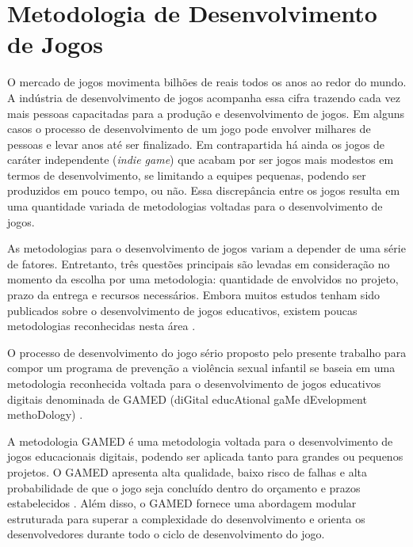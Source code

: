 \section{Metodologia de Desenvolvimento de Jogos}\label{sec:Engenharia}





O mercado de jogos movimenta bilhões de reais todos os anos ao redor do mundo. A indústria de desenvolvimento de jogos acompanha essa cifra trazendo cada vez mais pessoas capacitadas para a produção e desenvolvimento de jogos. Em alguns casos o processo de desenvolvimento de um jogo pode envolver milhares de pessoas e levar anos até ser finalizado. Em contrapartida há ainda os jogos de caráter independente (\textit{indie game}) que acabam por ser jogos mais modestos em termos de desenvolvimento, se limitando a equipes pequenas, podendo ser produzidos em pouco tempo, ou não. Essa discrepância entre os jogos resulta em uma quantidade variada de metodologias voltadas para o desenvolvimento de jogos.


As metodologias para o desenvolvimento de jogos variam a depender de uma série de fatores. Entretanto, três questões principais são levadas em consideração no momento da escolha por uma metodologia: quantidade de envolvidos no projeto, prazo da entrega e recursos necessários. Embora muitos estudos tenham sido publicados sobre o desenvolvimento de jogos educativos, existem poucas metodologias reconhecidas nesta área \cite{aslan2015gamed}. 

O processo de desenvolvimento do jogo sério proposto pelo presente trabalho para compor um programa de prevenção a violência sexual infantil se baseia em uma metodologia reconhecida voltada para o desenvolvimento de jogos educativos digitais denominada de GAMED (diGital educAtional gaMe dEvelopment methoDology) \cite{aslan2016digital}. 


A metodologia GAMED é uma metodologia voltada para o desenvolvimento de jogos educacionais digitais, podendo ser aplicada tanto para grandes ou pequenos projetos. O GAMED apresenta alta qualidade, baixo risco de falhas e alta probabilidade de que o jogo seja concluído dentro do orçamento e prazos estabelecidos \cite{aslan2015gamed}. Além disso, o GAMED fornece uma abordagem modular estruturada para superar a complexidade do desenvolvimento e orienta os desenvolvedores durante todo o ciclo de desenvolvimento do jogo.

